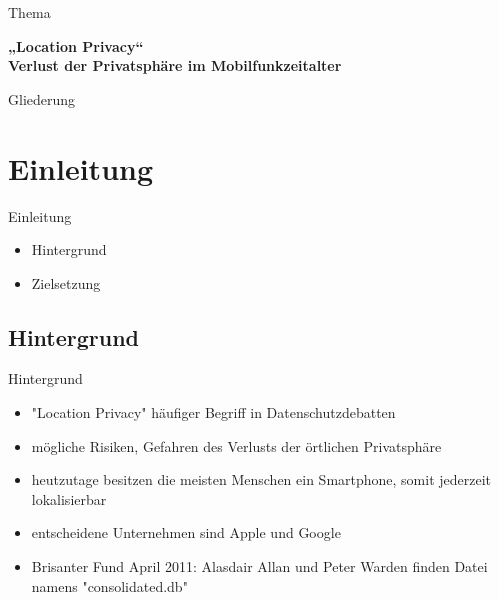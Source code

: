 




\begin{frame}[plain]
 \titlepage
\end{frame}

\begin{frame}{Thema}
\begin{center}
  \huge \textbf{„Location Privacy“\\ \vspace{.5cm} Verlust der Privatsphäre im Mobilfunkzeitalter}
\end{center}
\end{frame}

\begin{frame}{Gliederung}
\end{frame}

\section{Einleitung}
\begin{frame}{Einleitung}
\begin{itemize}
  \item Hintergrund
  \item Zielsetzung
\end{itemize}
\end{frame}

\subsection{Hintergrund}
\begin{frame}{Hintergrund}
\begin{itemize}
  \item "Location Privacy" häufiger Begriff in Datenschutzdebatten
  \item mögliche Risiken, Gefahren des Verlusts der örtlichen Privatsphäre
  \item heutzutage besitzen die meisten Menschen ein Smartphone, somit jederzeit lokalisierbar
  \item entscheidene Unternehmen sind Apple und Google
  \item Brisanter Fund April 2011: Alasdair Allan und Peter Warden finden Datei namens "consolidated.db"
\end{itemize}
\end{frame}

